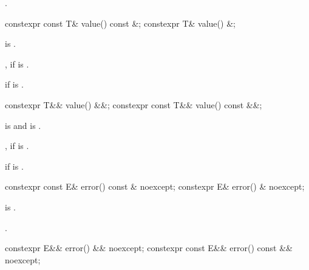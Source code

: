 \begin{itemdescr}
\pnum
\returns
{}.
\end{itemdescr}

%
\begin{itemdecl}
constexpr const T& value() const &;
constexpr T& value() &;
\end{itemdecl}

\begin{itemdescr}
\pnum
\mandates
{} is .

\pnum
\returns
{}, if  is .

\pnum
\throws
{} if  is .
\end{itemdescr}

%
\begin{itemdecl}
constexpr T&& value() &&;
constexpr const T&& value() const &&;
\end{itemdecl}

\begin{itemdescr}
\pnum
\mandates
{} is  and
 is .

\pnum
\returns
{}, if  is .

\pnum
\throws
{}
if  is .
\end{itemdescr}

%
\begin{itemdecl}
constexpr const E& error() const & noexcept;
constexpr E& error() & noexcept;
\end{itemdecl}

\begin{itemdescr}
\pnum
\hardexpects
{} is .

\pnum
\returns
{}.
\end{itemdescr}

%
\begin{itemdecl}
constexpr E&& error() && noexcept;
constexpr const E&& error() const && noexcept;
\end{itemdecl}

